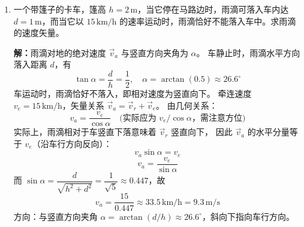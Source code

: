\documentclass{ctexart}
\begin{document}
\begin{enumerate}
\textbf{解：}
\begin{enumerate}
  \item $\beta = \dfrac{\mathrm{d}\omega}{\mathrm{d}t} = \dfrac{3g}{2l}\cos\theta$。利用 $\omega = \dfrac{\mathrm{d}\theta}{\mathrm{d}t}$，有
    \[
    \beta = \frac{\mathrm{d}\omega}{\mathrm{d}t} = \frac{\mathrm{d}\omega}{\mathrm{d}\theta}\frac{\mathrm{d}\theta}{\mathrm{d}t} = \omega\frac{\mathrm{d}\omega}{\mathrm{d}\theta}
    \]
    故 $\omega\,\mathrm{d}\omega = \beta\,\mathrm{d}\theta = \dfrac{3g}{2l}\cos\theta\,\mathrm{d}\theta$。
    积分：
    \[
    \int_{0}^{\omega} \omega\,\mathrm{d}\omega = \int_{\pi/6}^{\pi/3} \frac{3g}{2l}\cos\theta\,\mathrm{d}\theta
    \]
    \[
    \frac12\omega^{2} = \frac{3g}{2l}\Bigl(\sin\frac{\pi}{3} - \sin\frac{\pi}{6}\Bigr)
    = \frac{3g}{2l}\Bigl(\frac{\sqrt{3}}{2} - \frac12\Bigr)
    \]
    \[
    \omega = \sqrt{\frac{3g}{2l}(\sqrt{3} - 1)}
    \]
  \item 端点 $A$ 和中点 $B$ 的线速度：
    \[
    v_A = l\omega = l\sqrt{\frac{3g}{2l}(\sqrt{3} - 1)} = \sqrt{\frac{3gl}{2}(\sqrt{3} - 1)}
    \]
    \[
    v_B = \frac{l}{2}\omega = \frac{l}{2}\sqrt{\frac{3g}{2l}(\sqrt{3} - 1)} = \frac12\sqrt{\frac{3gl}{2}(\sqrt{3} - 1)}
    \]
\end{enumerate}

\item 一个带篷子的卡车，篷高 $h = 2\,\text{m}$，当它停在马路边时，雨滴可落入车内达 $d = 1\,\text{m}$，而当它以 $15\,\text{km/h}$ 的速率运动时，雨滴恰好不能落入车中。求雨滴的速度矢量。

\textbf{解：}雨滴对地的绝对速度 $\vec{v}_a$ 与竖直方向夹角为 $\alpha$。
车静止时，雨滴水平方向落入距离 $d$，有
\[
\tan\alpha = \frac{d}{h} = \frac{1}{2},\quad \alpha = \arctan(0.5) \approx 26.6^{\circ}
\]
车运动时，雨滴恰好不落入，即相对速度为竖直向下。
牵连速度 $v_e = 15\,\text{km/h}$，矢量关系 $\vec{v}_a = \vec{v}_r + \vec{v}_e$。
由几何关系：
\[
v_a = \frac{v_e}{\cos\alpha} \quad\text{(实际应为 } v_e/\cos\alpha \text{，需注意方位)}
\]
实际上，雨滴相对于车竖直下落意味着 $\vec{v}_r$ 竖直向下，
因此 $\vec{v}_a$ 的水平分量等于 $v_e$（沿车行方向反向）：
\[
v_a\sin\alpha = v_e
\]
\[
v_a = \frac{v_e}{\sin\alpha}
\]
而 $\sin\alpha = \dfrac{d}{\sqrt{h^{2}+d^{2}}} = \dfrac{1}{\sqrt{5}} \approx 0.447$，故
\[
v_a = \frac{15}{0.447} \approx 33.5\,\text{km/h} = 9.3\,\text{m/s}
\]
方向：与竖直方向夹角 $\alpha = \arctan(d/h) \approx 26.6^{\circ}$，斜向下指向车行方向。

\end{enumerate}
\end{document}
